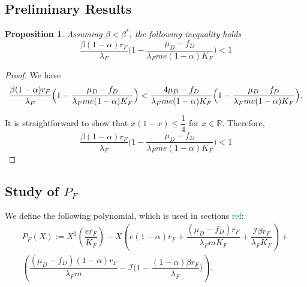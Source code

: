 \documentclass{article}
\newcommand{\lfw}{\lambda_{F}}
\newcommand{\lfw}{\lambda_{F}}
\newcommand{\cI}{\mathcal{I}}
\newcommand{\marc}[1]{\textcolor{teal}{#1}}
\newtheorem{prop}{Proposition}
\begin{document}
\begin{appendix}
\section{Preliminary Results}
\begin{prop} \label{propBeta}
Assuming $\beta < \beta^*$, the following inequality holds
$$
\dfrac{\beta (1-\alpha) r_F}{\lfw} \Big(1 - \dfrac{\mu_D - f_D}{\lfw m e (1-\alpha) K_F}\Big) < 1
$$
\end{prop}

\begin{proof}
We have
\begin{equation*}
\dfrac{\beta (1-\alpha) r_F}{\lfw} \Big(1 - \dfrac{\mu_D - f_D}{\lfw m e (1-\alpha) K_F}\Big) < \dfrac{4 \mu_D - f_D}{\lfw m e (1-\alpha) K_F} \Big(1 - \dfrac{\mu_D - f_D}{\lfw m e (1-\alpha) K_F}\Big).\\
\end{equation*}

It is straightforward to show that $x(1 - x) \leq \dfrac{1}{4}$ for $x \in \mathbb{R}$. Therefore,
\begin{equation*}
\dfrac{\beta (1-\alpha) r_F}{\lfw} \Big(1 - \dfrac{\mu_D - f_D}{\lfw m e (1-\alpha) K_F}\Big) <  1
\end{equation*}
\end{proof}
\subsection{Study of $P_F$} \label{section:study of PF}
We define the following polynomial, which is used in sections \marc{ref}:
\begin{multline}
P_F(X) := X^2 \left(\dfrac{er_F}{K_F} \right) - X \left(e(1-\alpha)r_F + \dfrac{(\mu_D - f_D) r_F}{\lfw m K_F} + \dfrac{\cI \beta r_F}{\lfw K_F} \right) + \\ \left(\dfrac{(\mu_D - f_D)(1-\alpha) r_F}{\lfw m} - \cI\Big(1 - \dfrac{(1-\alpha)\beta r_F}{\lfw} \Big) \right).
\label{polynome-Feq}
\end{multline} 


\end{appendix}
\end{document}
